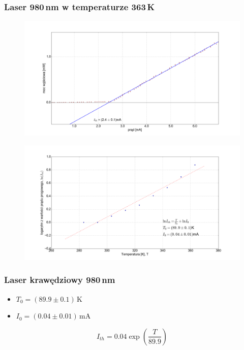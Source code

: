 \documentclass[xcolor={dvipsnames,table}]{beamer}
\begin{document}
\begin{frame}
\frametitle{Laser 980\,nm w temperaturze 363\,K}
\center
\begin{figure}
   \includegraphics[width=1.10\textwidth,natwidth=69,natheight=87]{temp_90_fit.png}
\end{figure}
\end{frame}

\begin{frame}
\center
\begin{figure}
   \includegraphics[width=1.10\textwidth,natwidth=69,natheight=87]{fit_i_th.png}
\end{figure}
\end{frame}

\begin{frame}
\frametitle{Laser krawędziowy 980\,nm}
\begin{itemize}
\item $T_0 = (89.9 \pm 0.1)$\,K
\item $I_0 = (0.04 \pm 0.01)$\,mA
\end{itemize}
\begin{equation*}
I_{th} = 0.04 \exp \left( \frac{T}{89.9} \right)
\end{equation*}
\end{frame}
\end{document}
